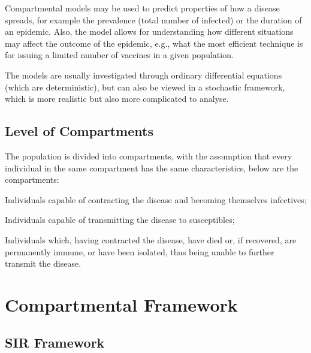 \documentclass[fontsize=17pt]{article}
\begin{document}
Compartmental models may be used to predict properties of how a disease spreads, for example the prevalence (total number of infected) or the duration of an epidemic. Also, the model allows for understanding how different situations may affect the outcome of the epidemic, e.g., what the most efficient technique is for issuing a limited number of vaccines in a given population. 

The models are usually investigated through ordinary differential equations (which are deterministic), but can also be viewed in a stochastic framework, which is more realistic but also more complicated to analyse.


\subsection{Level of Compartments}
The population is divided into compartments, with the assumption that every individual in the same compartment has the same characteristics, below are the compartments:

\begin{description}[leftmargin=!,labelwidth=\widthof{\bfseries Susceptibles}]
	
	\item[Susceptibles] Individuals capable of contracting the
	disease and becoming themselves infectives; 
	\item[Infactives] Individuals capable of transmitting the
	disease to susceptibles; 
	\item[Removed] Individuals which, having contracted
	the disease, have died or, if recovered, are permanently immune,
	or have been isolated, thus being unable to further transmit the disease. 
	
\end{description}

\section{Compartmental Framework}
\subsection{SIR Framework}
\end{document}
